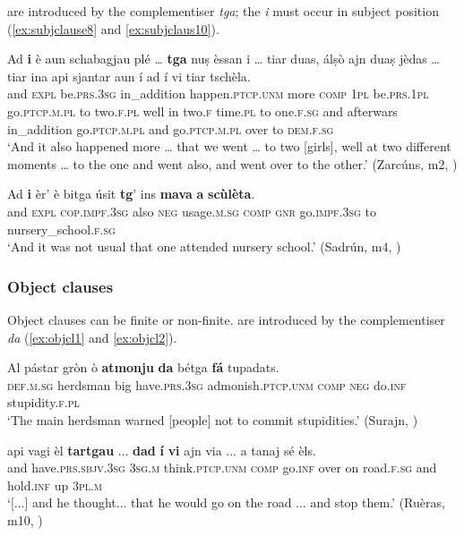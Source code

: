  are introduced by the complementiser \textit{tga}; the   \textit{i} must occur in subject position (\ref{ex:subjclause8} and \ref{ex:subjclaus10}).

\ea
\label{ex:subjclause8}
\gll    Ad \textbf{i} è aun schabagjau plé … \textbf{tga} nuṣ èssan i … tiar duas, álṣò ajn duaṣ jèdas … tiar ina api sjantar aun í ad í vi tiar tschèla.\\
and \textsc{expl} be.\textsc{prs.3sg} in\_addition happen.\textsc{ptcp.unm} more {} \textsc{comp}  \textsc{1pl} be.\textsc{prs.1pl} go.\textsc{ptcp.m.pl} {} to two.\textsc{f.pl} well in two.\textsc{f} time.\textsc{pl} {} to one.\textsc{f.sg} and afterwars in\_addition go.\textsc{ptcp.m.pl} and  go.\textsc{ptcp.m.pl} over to \textsc{dem.f.sg}\\
\glt `And it also happened more … that we went … to two [girls], well at two different moments … to the one and went also, and went over to the other.' (Zarcúns, m2, )
\z

\ea
\label{ex:subjclaus10}
\gll Ad \textbf{i} èr’ è bitga úsit \textbf{tg}’ ins \textbf{mava} \textbf{a} \textbf{scùlèta}.\\
and  \textsc{expl} \textsc{cop.impf.3sg} also \textsc{neg} usage.\textsc{m.sg}  \textsc{comp} \textsc{gnr} go.\textsc{impf.3sg} to nursery\_school.\textsc{f.sg}\\
\glt `And it was not usual that one attended nursery school.' (Sadrún, m4,  )
\z 


\subsubsection{Object clauses}\label{sec:6.2.1.2}
Object clauses can be finite or non-finite. are introduced by the complementiser \textit{da} (\ref{ex:objcl1} and \ref{ex:objcl2}).

\ea
\label{ex:objcl1}
\gll Al pástar gròn ò \textbf{atmonju} \textbf{da} bétga \textbf{fá} tupadats.\\
\textsc{def.m.sg} herdsman big have.\textsc{prs.3sg} admonish.\textsc{ptcp.unm} \textsc{comp} \textsc{neg} do.\textsc{inf} stupidity.\textsc{f.pl}\\
\glt `The main herdsman warned [people] not to commit stupidities.' (Surajn, \citealt[128]{Büchli1966})
\z

\ea
\label{ex:objcl2}
\gll  [...] api vagi èl \textbf{tartgau} ... \textbf{dad} \textbf{í} \textbf{vi} ajn via ... a tanaj sé èls.  \\
{} and have.\textsc{prs.sbjv.3sg} \textsc{3sg.m} think.\textsc{ptcp.unm} {} \textsc{comp} go.\textsc{inf} over on road.\textsc{f.sg} {} and hold.\textsc{inf} up \textsc{3pl.m}\\
\glt `[...] and he thought... that he would go on the road ... and stop them.' (Ruèras, m10, )
\z


